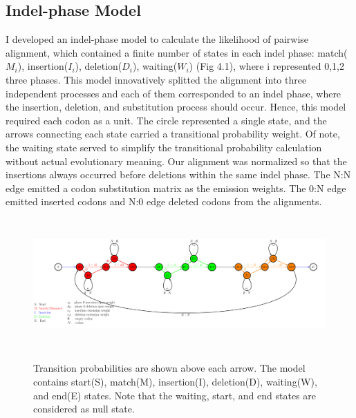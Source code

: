 \subsection{Indel-phase Model}
I developed an indel-phase model to calculate the likelihood of pairwise alignment, which contained a finite number of states in each indel phase: match($M_i$), insertion($I_i$), deletion($D_i$), waiting($W_i$) (Fig 4.1), where i represented 0,1,2 three phases. This model innovatively splitted the alignment into three independent processes and each of them corresponded to an indel phase, where the insertion, deletion, and substitution process should occur. Hence, this model required each codon as a unit. The circle represented a single state, and the arrows connecting each state carried a transitional probability weight. Of note, the waiting state served to simplify the transitional probability calculation without actual evolutionary meaning. Our alignment was normalized so that the insertions always occurred before deletions within the same indel phase. The N:N edge emitted a codon substitution matrix as the emission weights. The 0:N edge emitted inserted codons and N:0 edge deleted codons from the alignments.   
\newpage
\begin{figure}[H]
     \centering
     \begin{minipage}[t]{1\textwidth}
     \includegraphics[width=\linewidth,height=5cm]{Fig1.pdf}
     { {Transition probabilities are shown above each arrow. The model contains start(S), match(M), insertion(I), deletion(D), waiting(W), and end(E) states. Note that the waiting, start, and end states are considered as null state.} 
     \par}
     \end{minipage}
\end{figure}

